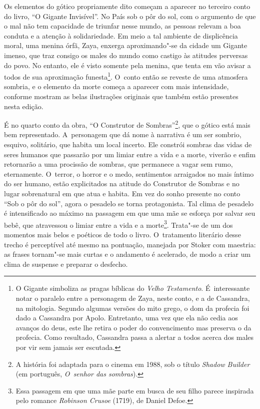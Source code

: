 Os elementos do gótico propriamente dito começam a aparecer no terceiro
conto do livro, ``O Gigante Invisível''. No País sob o pôr do sol, com o
argumento de que o mal não tem capacidade de triunfar nesse mundo, as
pessoas relevam a boa conduta e a atenção à solidariedade. Em meio a
tal ambiente de displicência moral, uma menina órfã, Zaya, enxerga
aproximando"-se da cidade um Gigante imenso, que traz consigo os males do
mundo como castigo às atitudes perversas do povo. No entanto, ele é
visto somente pela menina, que tenta em vão avisar a todos de sua
aproximação funesta\footnote{O Gigante simboliza as pragas bíblicas do
\emph{Velho Testamento}. É~interessante notar o paralelo entre a
personagem de Zaya, neste conto, e a de Cassandra, na mitologia. Segundo
algumas versões do mito grego, o dom da profecia foi dado a Cassandra
por Apolo. Entretanto, uma vez que ela não cedia aos avanços do deus,
este lhe retira o poder do convencimento mas preserva o da profecia.
Como resultado, Cassandra passa a alertar a todos acerca dos males por
vir sem jamais ser escutada.}. O~conto então se reveste de
uma atmosfera sombria, e o elemento da morte começa a aparecer com mais
intensidade, conforme mostram as belas ilustrações originais que também
estão presentes nesta edição.

É no quarto conto da obra, ``O Construtor de Sombras''\footnote{A história foi adaptada para o cinema em
1988, sob o título \emph{Shadow Builder} (em português, \emph{O~senhor
das sombras}).}, que o gótico está mais bem representado. A~personagem que dá nome à narrativa é um ser sombrio, esquivo, solitário,
que habita um local incerto. Ele constrói sombras das vidas de seres
humanos que passarão por um limiar entre a vida e a morte, viverão e
enfim retornarão a uma procissão de sombras, que permanece a vagar sem
rumo, eternamente. O~terror, o horror e o medo, sentimentos arraigados
no mais íntimo do ser humano, estão explicitados na atitude do
Construtor de Sombras e no lugar sobrenatural em que atua e habita. Em
vez do sonho presente no conto ``Sob o pôr do sol'', agora o pesadelo se
torna protagonista. Tal clima de pesadelo é intensificado ao máximo na
passagem em que uma mãe se esforça por salvar seu bebê, que atravessou o
limiar entre a vida e a morte\footnote{Essa passagem em que uma mãe parte em busca
de seu filho parece inspirada pelo romance \emph{Robinson Crusoe}
(1719), de Daniel Defoe.}. Trata"-se de um
dos momentos mais belos e poéticos de todo o livro. O~tratamento
literário desse trecho é perceptível até mesmo na pontuação, manejada
por Stoker com maestria: as frases tornam"-se mais curtas e o andamento é
acelerado, de modo a criar um clima de suspense e preparar o desfecho.

